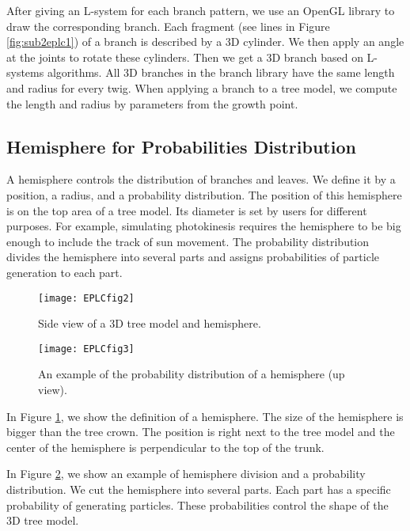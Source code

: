 After giving an L-system for each branch pattern, we use an OpenGL library to draw the corresponding branch. Each fragment (see lines in Figure \ref{fig:sub2eplc1}) of a branch is described by a 3D cylinder. We then apply an angle at the joints to rotate these cylinders. Then we get a 3D branch based on L-systems algorithms. All 3D branches in the branch library have the same length and radius for every twig. When applying a branch to a tree model, we compute the length and radius by parameters from the growth point.

\subsection{Hemisphere for Probabilities Distribution}

A hemisphere controls the distribution of branches and leaves. We define it by a position, a radius, and a probability distribution. The position of this hemisphere is on the top area of a tree model. Its diameter is set by users for different purposes. For example, simulating photokinesis requires the hemisphere to be big enough to include the track of sun movement. The probability distribution divides the hemisphere into several parts and assigns probabilities of particle generation to each part. 

\begin{figure}[!t]
\centering
\texttt{[image: EPLCfig2]}
\caption{Side view of a 3D tree model and hemisphere.}
\label{fig:EPLCfig2}
\end{figure}
 
\begin{figure}[!t]
\centering
\texttt{[image: EPLCfig3]}
\caption[An example of probability distribution of hemisphere.]{An example of the probability distribution of a hemisphere (up view).}
\label{fig:EPLCfig3}
\end{figure} 

In Figure \ref{fig:EPLCfig2}, we show the definition of a hemisphere. The size of the hemisphere is bigger than the tree crown. The position is right next to the tree model and the center of the hemisphere is perpendicular to the top of the trunk. 

In Figure \ref{fig:EPLCfig3}, we show an example of hemisphere division and a probability distribution. We cut the hemisphere into several parts. Each part has a specific probability of generating particles. These probabilities control the shape of the 3D tree model.


